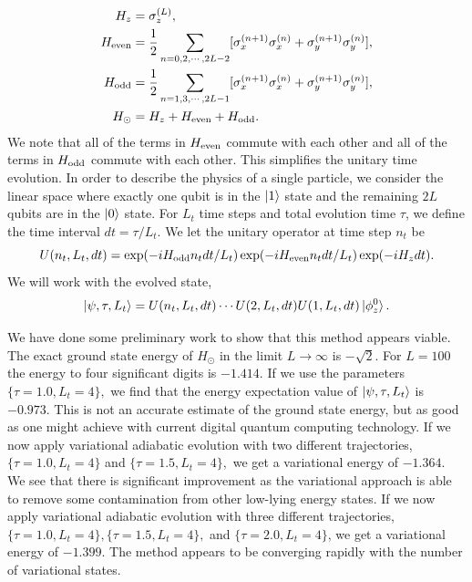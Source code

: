 \documentclass[10pt]{article}
\begin{document}
\begin{align}
H_z &= \sigma_z^{(L)}, \\
H_{\rm even} &= \frac{1}{2} \sum_{n=0,2,\cdots,2L-2} [\sigma_x^{(n+1)}\sigma_x^{(n)}
+ \sigma_y^{(n+1)}\sigma_y^{(n)}], \\
H_{\rm odd} &= \frac{1}{2} \sum_{n=1,3,\cdots,2L-1} [\sigma_x^{(n+1)}\sigma_x^{(n)}
+ \sigma_y^{(n+1)}\sigma_y^{(n)}], \\
H_\odot &= H_z + H_{\rm even} + H_{\rm odd}.
\end{align}
We note that all of the terms in $H_{\rm even}$ commute with each other and all of the terms in $H_{\rm odd}$ commute with each other.  This simplifies the unitary time evolution.  In order to describe the physics of a single particle, we consider the linear space where exactly one qubit is in the $\ket{1}$ state and the remaining $2L$ qubits are in the  $\ket{0}$ state.  For $L_t$ time steps and total evolution time $\tau$, we define the time interval $dt=\tau/L_t$.  We let the unitary operator at time step $n_t$ be
\begin{equation}
U(n_t,L_{t},dt) = \exp(-iH_{\rm odd}n_tdt/L_t)\exp(-iH_{\rm even}n_tdt/L_t)\exp(-iH_ zdt).   
\end{equation} 
We will work with the evolved state,
\begin{equation}
\ket{\psi,\tau,L_t} = U(n_t,L_{t},dt) \cdots U(2,L_{t},dt)U(1,L_{t},dt)\ket{\phi_z^0}. 
\end{equation}

We have done some preliminary work to show that this method appears
viable. The exact ground state energy of $H_\odot$ in the limit $L
\rightarrow \infty$ is $-\sqrt{2}$.  For $L = 100$ the energy to four
significant digits is $-1.414$. If we use the parameters $\{\tau =
1.0,L_t = 4\},$ we find that the energy expectation value of
$\ket{\psi,\tau,L_t}$ is $-0.973$.  This is not an accurate estimate
of the ground state energy, but as good as one might achieve with
current digital quantum computing technology.  If we now apply
variational adiabatic evolution with two different trajectories,
$\{\tau = 1.0,L_t = 4\}$ and $\{\tau = 1.5,L_t = 4\},$ we get a
variational energy of $-1.364$.  We see that there is significant
improvement as the variational approach is able to remove some
contamination from other low-lying energy states. If we now apply
variational adiabatic evolution with three different trajectories,
$\{\tau = 1.0,L_t = 4\}, \{\tau = 1.5,L_t = 4\},$ and $\{\tau =
2.0,L_t = 4\}$, we get a variational energy of $-1.399$.  The method
appears to be converging rapidly with the number of variational
states.
\end{document}
